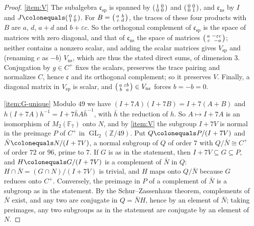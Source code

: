 \documentclass[12pt]{amsart}
\newcommand{\F}{{\mathbb F}}
\newcommand{\Z}{\mathbb{Z}}
\DeclareMathOperator{\ns}{ns}
\DeclareMathOperator{\spc}{sp}
\newcommand{\GL}{\operatorname{GL}}
\numberwithin{equation}{section}
\theoremstyle{definition}
\begin{document}
\begin{proof}
  \eqref{item:V} The subalgebra $\mathfrak{c}_{\spc}$ is spanned by
  $\begin{psmallmatrix*}[r] 1 & 0 \\ 0 & 0\end{psmallmatrix*}$ and
  $\begin{psmallmatrix*}[r] 0 & 0 \\ 0 & 1\end{psmallmatrix*}$, and
  $\mathfrak{c}_{\ns}$ by $I$ and
  $J \colonequals \begin{psmallmatrix*}[r] 0 & \varepsilon \\ 1 & 0\end{psmallmatrix*}$.
  For $B = \begin{psmallmatrix*}[r] a & b \\ c & d\end{psmallmatrix*}$, the
  traces of these four products with $B$ are $a$, $d$, $a + d$ and
  $b + \varepsilon c$. So the orthogonal complement of $\mathfrak{c}_{\spc}$ is
  the space of matrices with zero diagonal, and that of $\mathfrak{c}_{\ns}$ the
  space of matrices
  $\begin{psmallmatrix*}[r] a & -\varepsilon c \\ c & -a\end{psmallmatrix*}$;
  neither contains a nonzero scalar, and adding the scalar matrices gives
  $V_{\spc}$ and (renaming $c$ as $-b$) $V_{\ns}$, which are thus the stated
  direct sums, of dimension $3$. Conjugation by $g \in C^{+}$ fixes the
  scalars, preserves the trace pairing and normalizes $C$, hence
  $\mathfrak{c}$ and its orthogonal complement; so it preserves
  $V$. Finally, a diagonal matrix in $V_{\spc}$ is scalar, and
  $\begin{psmallmatrix*}[r] a & \varepsilon b \\ b & a\end{psmallmatrix*} \in V_{\ns}$
  forces $b = -b = 0$.

  \eqref{item:G-unique} Modulo $49$ we have $(I + 7A)(I + 7B) = I + 7(A + B)$
  and $h(I + 7A)h^{-1} = I + 7\bar hA\bar h^{-1}$, with $\bar h$ the reduction
  of $h$. So $A \mapsto I + 7A$ is an isomorphism of $M_2(\F_7)$ onto $N$, and
  by \eqref{item:V} the subgroup $I + 7V$ is normal in the preimage
  $P$ of $C^{+}$ in $\GL_2(\Z/49)$. Put
  $Q \colonequals P/(I + 7V)$ and $\bar N \colonequals N/(I + 7V)$,
  a normal subgroup of $Q$ of order $7$ with $Q/\bar N \cong C^{+}$
  of order $72$ or $96$, prime to $7$. If $G$ is as in the statement, then
  $I + 7V \subseteq G \subseteq P$, and $H \colonequals G/(I + 7V)$
  is a complement of $\bar N$ in $Q$: $H \cap \bar N = (G \cap N)/(I + 7V)$
  is trivial, and $H$ maps onto $Q/\bar N$ because $G$ reduces onto
  $C^{+}$. Conversely, the preimage in $P$ of a complement of
  $\bar N$ is a subgroup as in the statement. By the Schur--Zassenhaus
  theorem, complements of $\bar N$ exist, and any two are conjugate in
  $Q = \bar N H$, hence by an element of $\bar N$; taking preimages, any two
  subgroups as in the statement are conjugate by an element of $N$.


\end{proof}
\end{document}
